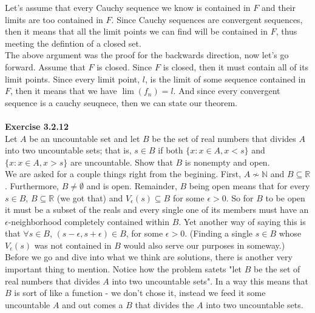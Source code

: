 Let's assume that every Cauchy sequence we know is contained in $F$ and their limits are too contained in $F$.
Since Cauchy sequences are convergent sequences, then it means that all the limit points we can find
will be contained in $F$, thus meeting the defintion of a closed set.
\\

The above argument was the proof for the backwards direction, now let's go forward.
Assume that $F$ is closed.
Since $F$ is closed, then it must contain all of its limit points.
Since every limit point, $l$, is the limit of some sequence contained in $F$, then it means that we have
$\lim (f_n) = l$.
And since every convergent sequence is a cauchy seuqnece, then we can state our theorem.
\\~\\



\textbf{Exercise 3.2.12}
\\

Let $A$ be an uncountable set and let $B$ be the set of real numbers that divides $A$ into two uncountable sets;
that is, $s \in B$ if both $\{ x : x \in A, x < s \}$ and $\{ x : x \in A, x > s\}$ are uncountable.
Show that $B$ is nonempty and open.
\\

We are asked for a couple things right from the begining.
First, $A \not\sim \mathbb{N}$ and $B \subseteq \mathbb{R}$.
Furthermore, $B \neq \emptyset$ and is open.
Remainder, $B$ being open means that for every $s\in B$, $B \subseteq \mathbb{R}$ (we got that)
and $V_\epsilon (s) \subseteq B$ for some $\epsilon >0$.
So for $B$ to be open it must be a subset of the reals and every single one of its members must have
an $\epsilon$-neighborhood completely contained within $B$.
Yet another way of saying this is that $\forall s \in B$, $(s-\epsilon, s+\epsilon) \in B$, for some $\epsilon >0$.
(Finding a single $s\in B$ whose $V_{\epsilon} (s)$ was not contained in $B$ would also serve our purposes in someway.)
\\

Before we go and dive into what we think are solutions, there is another very important thing to mention.
Notice how the problem satets "let $B$ be the set of real numbers that divides $A$ into two uncountable sets".
In a way this means that $B$ is sort of like a function - we don't chose it, instead we feed it some uncountable $A$
and out comes a $B$ that divides the $A$ into two uncountable sets.
\\

